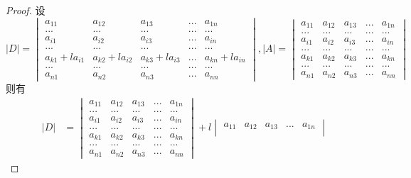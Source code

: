 \documentclass[blue,normal,cn]{elegantnote}
\begin{document}
\begin{proof}
    设
    \begin{equation*}
        |D|=
        \begin{vmatrix} 
            a_{11}&a_{12} & a_{13} &...& a_{1n}\\
            ...&...&...&...&...\\
            a_{i1}&a_{i2} & a_{i3} &...& a_{in}\\
            ...&...&...&...&...\\
            a_{k1}+la_{i1} & a_{k2}+la_{i2} & a_{k3}+la_{i3} &...& a_{kn}+la_{in}\\
            ...&...&...&...&...\\
            a_{n1}&a_{n2} & a_{n3} &...& a_{nn}
            \end{vmatrix}
        ,|A|=
            \begin{vmatrix} 
                a_{11}&a_{12} & a_{13} &...& a_{1n}\\
                ...&...&...&...&...\\
                a_{i1}&a_{i2} & a_{i3} &...& a_{in}\\
                ...&...&...&...&...\\
                a_{k1}&a_{k2} & a_{k3} &...& a_{kn}\\
                ...&...&...&...&...\\
                a_{n1}&a_{n2} & a_{n3} &...& a_{nn}
                \end{vmatrix}
        \end{equation*}
则有
    \begin{equation*}
        \begin{aligned}
        |D|&=
            \begin{vmatrix} 
                a_{11}&a_{12} & a_{13} &...& a_{1n}\\
                ...&...&...&...&...\\
                a_{i1}&a_{i2} & a_{i3} &...& a_{in}\\
                ...&...&...&...&...\\
                a_{k1} & a_{k2} & a_{k3} &...& a_{kn}\\
                ...&...&...&...&...\\
                a_{n1}&a_{n2} & a_{n3} &...& a_{nn}
            \end{vmatrix}
        +l
            \begin{vmatrix} 
                a_{11}&a_{12} & a_{13} &...& a_{1n}\\

\end{vmatrix}
\end{aligned}
\end{equation*}
\end{proof}
\end{document}
